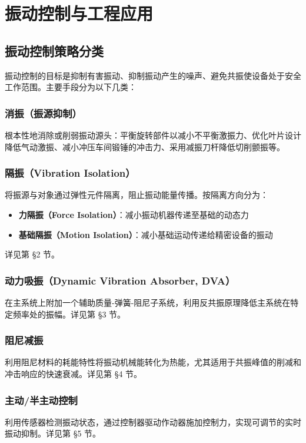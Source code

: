 \chapter{振动控制与工程应用}

\section{振动控制策略分类}
振动控制的目标是抑制有害振动、抑制振动产生的噪声、避免共振使设备处于安全工作范围。主要手段分为以下几类：

\subsection{消振（振源抑制）}
根本性地消除或削弱振动源头：平衡旋转部件以减小不平衡激振力、优化叶片设计降低气动激振、减小冲压车间锻锤的冲击力、采用减振刀杆降低切削颤振等。

\subsection{隔振（Vibration Isolation）}
将振源与对象通过弹性元件隔离，阻止振动能量传播。按隔离方向分为：
\begin{itemize}
    \item \textbf{力隔振（Force Isolation）}：减小振动机器传递至基础的动态力
    \item \textbf{基础隔振（Motion Isolation）}：减小基础运动传递给精密设备的振动
\end{itemize}
详见第 \S 2 节。

\subsection{动力吸振（Dynamic Vibration Absorber, DVA）}
在主系统上附加一个辅助质量-弹簧-阻尼子系统，利用反共振原理降低主系统在特定频率处的振幅。详见第 \S 3 节。

\subsection{阻尼减振}
利用阻尼材料的耗能特性将振动机械能转化为热能，尤其适用于共振峰值的削减和冲击响应的快速衰减。详见第 \S 4 节。

\subsection{主动/半主动控制}
利用传感器检测振动状态，通过控制器驱动作动器施加控制力，实现可调节的实时振动抑制。详见第 \S 5 节。


